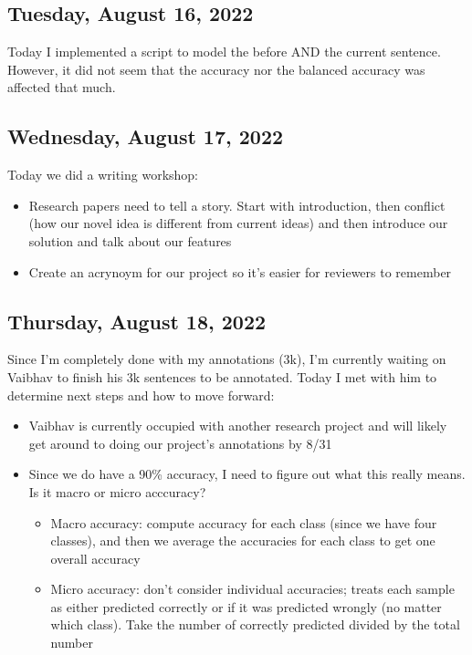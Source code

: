 \documentclass[11pt,letterpaper]{article}
\begin{document}
\subsection{Tuesday, August 16, 2022}
Today I implemented a script to model the before AND the current sentence. However, it did not seem that the accuracy nor the balanced accuracy was affected that much.

\subsection{Wednesday, August 17, 2022}
Today we did a writing workshop:

\begin{itemize}
    \item Research papers need to tell a story. Start with introduction, then conflict (how our novel idea is different from current ideas) and then introduce our solution and talk about our features
    \item Create an acrynoym for our project so it's easier for reviewers to remember
\end{itemize}

\subsection{Thursday, August 18, 2022}
Since I'm completely done with my annotations (3k), I'm currently waiting on Vaibhav to finish his 3k sentences to be annotated. Today I met with him to determine next steps and how to move forward:

\begin{itemize}
    \item Vaibhav is currently occupied with another research project and will likely get around to doing our project's annotations by 8/31
    \item Since we do have a 90\% accuracy, I need to figure out what this really means. Is it macro or micro acccuracy?
    \begin{itemize}
        \item Macro accuracy: compute accuracy for each class (since we have four classes), and then we average the accuracies for each class to get one overall accuracy

        \item Micro accuracy: don’t consider individual accuracies; treats each sample as either predicted correctly or if it was predicted wrongly (no matter which class). Take the number of correctly predicted divided by the total number
    \end{itemize}
\end{itemize}
\end{document}
